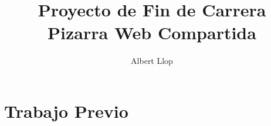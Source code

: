 \documentclass [11pt]{report}
\begin{document}
\author{Albert Llop}
\title{\Huge{\textbf{Proyecto de Fin de Carrera} \\ Pizarra Web Compartida}}
\maketitle
\newpage
\tableofcontents
\chapter{Trabajo Previo}

\newpage

\newpage

\newpage
\end{document}
